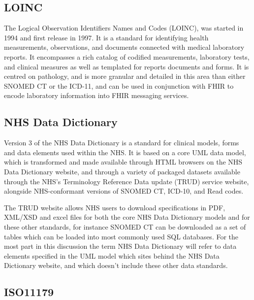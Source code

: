 \documentclass[runningheads]{llncs}
\begin{document}
	\subsection{LOINC}
	The Logical Observation Identifiers Names and Codes (LOINC), was started in 1994 and first release in 1997. It is a standard for identifying health measurements, observations, and documents connected with medical laboratory reports. It encompasses a rich catalog of codified measurements, laboratory tests, and clinical measures as well as templated for reports documents and forms. It is centred on pathology, and is more granular and detailed in this area than either SNOMED CT or the ICD-11, and can be used in conjunction with FHIR to encode laboratory information into FHIR messaging services.
	\subsection{NHS Data Dictionary}
	Version 3 of the NHS Data Dictionary is a standard for clinical models, forms and data elements used within the NHS. It is based on a core UML data model, which is transformed and made available through HTML browsers on the NHS Data Dictionary website, and through a variety of packaged datasets available through the NHS's Terminology Reference Data update (TRUD) service website, alongside NHS-conformant versions of SNOMED CT, ICD-10, and Read codes. 
	
	The TRUD website allows NHS users to download specifications in PDF, XML/XSD and excel files for both the core NHS Data Dictionary models and for these other standards, for instance SNOMED CT can be downloaded as a set of tables which can be loaded into most commonly used SQL databases. For the most part in this discussion the term NHS Data Dictionary will refer to data elements specified in the UML model which sites behind the NHS Data Dictionary website, and which doesn't include these other data standards.
	
	\subsection{ISO11179}
	
\end{document}
